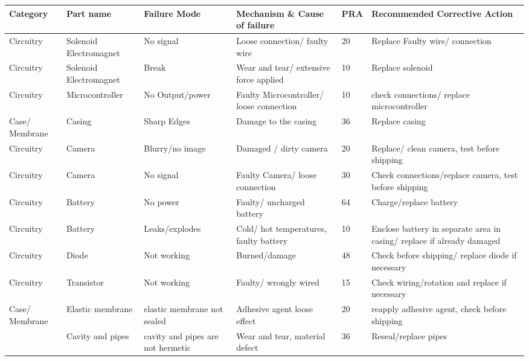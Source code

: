     \begin{table}[!ht] 
        \centering
        \begin{tabular}{b{1.7cm} b{2cm} b{2.5cm} b{4cm}l b{6cm}} 
            \textbf{Category} & \textbf{Part name} & \textbf{Failure Mode} & \textbf{Mechanism \& Cause of failure} & \textbf{PRA} & \textbf{Recommended Corrective Action} \\ \hline
            Circuitry & Solenoid Electromagnet & No signal & Loose connection/ faulty wire & 20 & Replace Faulty wire/ connection \\ 
            Circuitry & Solenoid Electromagnet & Break  & Wear and tear/ extensive force applied & 10 & Replace solenoid \\ 
            Circuitry & Microcontroller & No Output/power & Faulty Microcontroller/ loose connection & 10 & check connections/ replace microcontroller \\ 
            Case/ Membrane & Casing & Sharp Edges & Damage to the casing  & 36 & Replace casing \\ 
            Circuitry & Camera & Blurry/no image & Damaged / dirty camera & 20 & Replace/ clean camera, test before shipping \\ 
            Circuitry & Camera  & No signal & Faulty Camera/ loose connection & 30 & Check connections/replace camera, test before shipping \\ 
            Circuitry & Battery & No power & Faulty/ uncharged battery & 64 & Charge/replace battery \\ 
            Circuitry & Battery & Leaks/explodes & Cold/ hot temperatures, faulty battery & 10 & Enclose battery in separate area in casing/ replace if already damaged \\ 
            Circuitry & Diode & Not working & Burned/damage & 48 & Check before shipping/ replace diode if necessary \\ 
            Circuitry & Transistor  & Not working & Faulty/ wrongly wired & 15 & Check wiring/rotation and replace if necessary \\ 
            Case/ Membrane & Elastic membrane & elastic membrane not sealed & Adhesive agent loose effect & 20 & reapply adhesive agent, check before shipping \\ 
            ~ & Cavity and pipes & cavity and pipes are not hermetic & Wear and tear, material defect & 36 & Reseal/replace pipes \\ 

\end{tabular}
\end{table}
